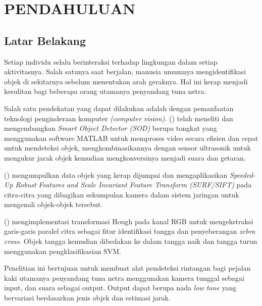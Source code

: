 \section*{PENDAHULUAN} %
\subsection*{Latar Belakang}
Setiap individu selalu berinteraksi terhadap lingkungan dalam setiap aktivitasnya. Salah satunya saat berjalan, manusia umumnya mengidentifikasi objek di sekitarnya sebelum menentukan arah geraknya. Hal ini kerap menjadi kesulitan bagi beberapa orang utamanya penyandang tuna netra.


Salah satu pendekatan yang dapat dilakukan adalah dengan pemanfaatan teknologi penginderaan komputer \textit{(computer vision)}. \citeauthor{rajput2014smart} (\cite*{rajput2014smart}) telah meneliti dan mengembangkan \textit{Smart Object Detector (SOD)} berupa tongkat yang menggunakan software MATLAB untuk memproses video secara efisien dan cepat untuk mendeteksi objek, mengkombinasikannya dengan sensor ultrasonik untuk mengukur jarak objek kemudian mengkonversinya menjadi suara dan getaran.

\citeauthor{Yi2013} (\cite*{Yi2013}) mengumpulkan data objek yang kerap dijumpai dan mengaplikasikan \textit{Speeded-Up Robust
Features and Scale Invariant Feature Transform (SURF/SIFT)} pada citra-citra yang dibagikan sekumpulan kamera dalam sistem jaringan untuk mengenali objek-objek tersebut.

\citeauthor{wang2014rgb} (\cite*{wang2014rgb}) mengimplementasi transformasi Hough pada kanal RGB untuk mengekstraksi garis-garis paralel citra sebagai fitur identifikasi tangga dan penyeberangan \textit{zebra cross}. Objek tangga kemudian dibedakan ke dalam tangga naik dan tangga turun menggunakan pengklasifikasian SVM.

Penelitian ini bertujuan untuk membuat alat pendeteksi rintangan bagi pejalan kaki utamanya penyandang tuna netra menggunakan kamera tunggal sebagai input, dan suara sebagai output. Output dapat berupa nada \textit{low tone} yang bervariasi berdasarkan jenis objek dan estimasi jarak.

